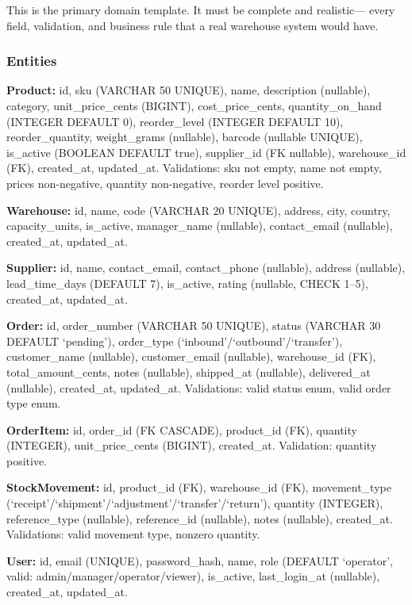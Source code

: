 \documentclass[11pt,a4paper]{article}
\begin{document}
This is the primary domain template. It must be complete and realistic---
every field, validation, and business rule that a real warehouse system
would have.

\subsubsection{Entities}

\textbf{Product:} id, sku (VARCHAR 50 UNIQUE), name, description (nullable),
category, unit\_price\_cents (BIGINT), cost\_price\_cents, quantity\_on\_hand
(INTEGER DEFAULT 0), reorder\_level (INTEGER DEFAULT 10), reorder\_quantity,
weight\_grams (nullable), barcode (nullable UNIQUE), is\_active (BOOLEAN
DEFAULT true), supplier\_id (FK nullable), warehouse\_id (FK), created\_at,
updated\_at. Validations: sku not empty, name not empty, prices non-negative,
quantity non-negative, reorder level positive.

\textbf{Warehouse:} id, name, code (VARCHAR 20 UNIQUE), address, city,
country, capacity\_units, is\_active, manager\_name (nullable),
contact\_email (nullable), created\_at, updated\_at.

\textbf{Supplier:} id, name, contact\_email, contact\_phone (nullable),
address (nullable), lead\_time\_days (DEFAULT 7), is\_active, rating
(nullable, CHECK 1--5), created\_at, updated\_at.

\textbf{Order:} id, order\_number (VARCHAR 50 UNIQUE), status (VARCHAR 30
DEFAULT `pending'), order\_type (`inbound'/`outbound'/`transfer'),
customer\_name (nullable), customer\_email (nullable), warehouse\_id (FK),
total\_amount\_cents, notes (nullable), shipped\_at (nullable),
delivered\_at (nullable), created\_at, updated\_at. Validations: valid
status enum, valid order type enum.

\textbf{OrderItem:} id, order\_id (FK CASCADE), product\_id (FK),
quantity (INTEGER), unit\_price\_cents (BIGINT), created\_at.
Validation: quantity positive.

\textbf{StockMovement:} id, product\_id (FK), warehouse\_id (FK),
movement\_type (`receipt'/`shipment'/`adjustment'/`transfer'/`return'),
quantity (INTEGER), reference\_type (nullable), reference\_id (nullable),
notes (nullable), created\_at. Validations: valid movement type,
nonzero quantity.

\textbf{User:} id, email (UNIQUE), password\_hash, name, role (DEFAULT
`operator', valid: admin/manager/operator/viewer), is\_active, last\_login\_at
(nullable), created\_at, updated\_at.
\end{document}
